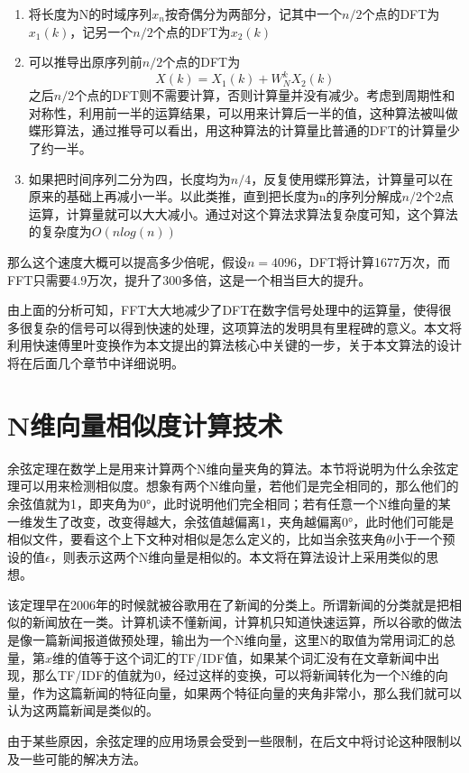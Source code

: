 \begin{enumerate}
\item 将长度为N的时域序列$x_n$按奇偶分为两部分，记其中一个$n/2$个点的DFT为$x_1(k)$，记另一个$n/2$个点的DFT为$x_2(k)$
\item 可以推导出原序列前$n/2$个点的DFT为$$X(k)=X_1(k)+W^k_NX_2(k)$$之后$n/2$个点的DFT则不需要计算，否则计算量并没有减少。考虑到周期性和对称性，利用前一半的运算结果，可以用来计算后一半的值，这种算法被叫做蝶形算法，通过推导可以看出，用这种算法的计算量比普通的DFT的计算量少了约一半。
\item 如果把时间序列二分为四，长度均为$n/4$，反复使用蝶形算法，计算量可以在原来的基础上再减小一半。以此类推，直到把长度为n的序列分解成$n/2$个2点运算，计算量就可以大大减小。通过对这个算法求算法复杂度可知，这个算法的复杂度为$O(nlog(n))$
\end{enumerate}

那么这个速度大概可以提高多少倍呢，假设$n=4096$，DFT将计算1677万次，而FFT只需要4.9万次，提升了300多倍，这是一个相当巨大的提升。

由上面的分析可知，FFT大大地减少了DFT在数字信号处理中的运算量，使得很多很复杂的信号可以得到快速的处理，这项算法的发明具有里程碑的意义。本文将利用快速傅里叶变换作为本文提出的算法核心中关键的一步，关于本文算法的设计将在后面几个章节中详细说明。

\section{N维向量相似度计算技术}

余弦定理在数学上是用来计算两个N维向量夹角的算法。本节将说明为什么余弦定理可以用来检测相似度。想象有两个N维向量，若他们是完全相同的，那么他们的余弦值就为1，即夹角为0°，此时说明他们完全相同；若有任意一个N维向量的某一维发生了改变，改变得越大，余弦值越偏离1，夹角越偏离0°，此时他们可能是相似文件，要看这个上下文种对相似是怎么定义的，比如当余弦夹角$\theta$小于一个预设的值$\epsilon$，则表示这两个N维向量是相似的。本文将在算法设计上采用类似的思想。

该定理早在2006年的时候就被谷歌用在了新闻的分类上。所谓新闻的分类就是把相似的新闻放在一类。计算机读不懂新闻，计算机只知道快速运算，所以谷歌的做法是像一篇新闻报道做预处理，输出为一个N维向量，这里N的取值为常用词汇的总量，第$x$维的值等于这个词汇的TF/IDF值，如果某个词汇没有在文章新闻中出现，那么TF/IDF的值就为0，经过这样的变换，可以将新闻转化为一个N维的向量，作为这篇新闻的特征向量，如果两个特征向量的夹角非常小，那么我们就可以认为这两篇新闻是类似的。

由于某些原因，余弦定理的应用场景会受到一些限制，在后文中将讨论这种限制以及一些可能的解决方法。

